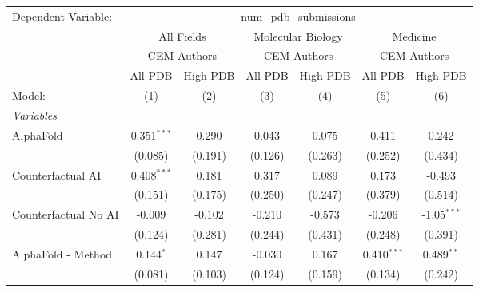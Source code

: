 \begingroup
\centering
\begin{tabular}{lcccccc}
   \tabularnewline \midrule \midrule
   Dependent Variable: & \multicolumn{6}{c}{num\_pdb\_submissions}\\
 & \multicolumn{2}{c}{All Fields} & \multicolumn{2}{c}{Molecular Biology} & \multicolumn{2}{c}{Medicine} \\
\cmidrule(lr){2-3} \cmidrule(lr){4-5} \cmidrule(lr){6-7}
 & \multicolumn{2}{c}{CEM Authors} & \multicolumn{2}{c}{CEM Authors} & \multicolumn{2}{c}{CEM Authors} \\
\cmidrule(lr){2-3} \cmidrule(lr){4-5} \cmidrule(lr){6-7}
 & \multicolumn{1}{c}{All PDB} & \multicolumn{1}{c}{High PDB} & \multicolumn{1}{c}{All PDB} & \multicolumn{1}{c}{High PDB} & \multicolumn{1}{c}{All PDB} & \multicolumn{1}{c}{High PDB} \\
\cmidrule(lr){2-2} \cmidrule(lr){3-3} \cmidrule(lr){4-4} \cmidrule(lr){5-5} \cmidrule(lr){6-6} \cmidrule(lr){7-7}
   Model:                                                     & (1)           & (2)     & (3)          & (4)           & (5)            & (6)\\  
   \midrule
   \emph{Variables}\\
   AlphaFold                                                  & 0.351$^{***}$ & 0.290   & 0.043        & 0.075         & 0.411          & 0.242\\   
                                                              & (0.085)       & (0.191) & (0.126)      & (0.263)       & (0.252)        & (0.434)\\   
   Counterfactual AI                                          & 0.408$^{***}$ & 0.181   & 0.317        & 0.089         & 0.173          & -0.493\\   
                                                              & (0.151)       & (0.175) & (0.250)      & (0.247)       & (0.379)        & (0.514)\\   
   Counterfactual No AI                                       & -0.009        & -0.102  & -0.210       & -0.573        & -0.206         & -1.05$^{***}$\\   
                                                              & (0.124)       & (0.281) & (0.244)      & (0.431)       & (0.248)        & (0.391)\\   
   AlphaFold - Method                                         & 0.144$^{*}$   & 0.147   & -0.030       & 0.167         & 0.410$^{***}$  & 0.489$^{**}$\\   
                                                              & (0.081)       & (0.103) & (0.124)      & (0.159)       & (0.134)        & (0.242)\\   

\end{tabular}
